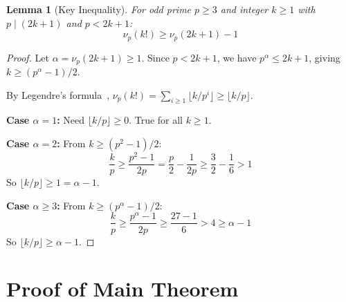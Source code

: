 \documentclass[11pt]{article}
\newtheorem{lemma}[theorem]{Lemma}
\theoremstyle{definition}
\theoremstyle{remark}
\begin{document}
\begin{lemma}[Key Inequality]\label{lem:factorial}
For odd prime $p \geq 3$ and integer $k \geq 1$ with $p \mid (2k+1)$ and $p < 2k+1$:
\[
\nu_p(k!) \geq \nu_p(2k+1) - 1
\]
\end{lemma}

\begin{proof}
Let $\alpha = \nu_p(2k+1) \geq 1$. Since $p < 2k+1$, we have $p^\alpha \leq 2k+1$,
giving $k \geq (p^\alpha - 1)/2$.

By Legendre's formula~\cite{legendre}, $\nu_p(k!) = \sum_{i \geq 1} \lfloor k/p^i \rfloor \geq \lfloor k/p \rfloor$.

\textbf{Case $\alpha = 1$:} Need $\lfloor k/p \rfloor \geq 0$. True for all $k \geq 1$.

\textbf{Case $\alpha = 2$:} From $k \geq (p^2-1)/2$:
\[
\frac{k}{p} \geq \frac{p^2-1}{2p} = \frac{p}{2} - \frac{1}{2p} \geq \frac{3}{2} - \frac{1}{6} > 1
\]
So $\lfloor k/p \rfloor \geq 1 = \alpha - 1$.

\textbf{Case $\alpha \geq 3$:} From $k \geq (p^\alpha - 1)/2$:
\[
\frac{k}{p} \geq \frac{p^\alpha - 1}{2p} \geq \frac{27 - 1}{6} > 4 \geq \alpha - 1
\]
So $\lfloor k/p \rfloor \geq \alpha - 1$.
\end{proof}

\section{Proof of Main Theorem}
\end{document}
